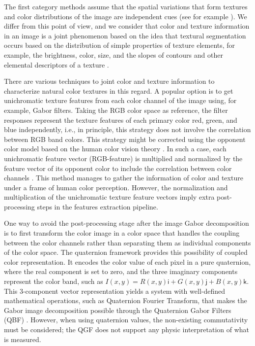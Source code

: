 The first category methods assume that the spatial variations that form textures and color distributions of the image are independent cues (see for example \citep{Permuter.Francos.ea:PR:2006}). We differ from this point of view, and we consider that color and texture information in an image is a joint phenomenon based on the idea that textural segmentation occurs based on the distribution of simple properties of texture elements, for example, the brightness, color, size, and the slopes of contours and other elemental descriptors of a texture \citep{Werner.Chalupa:Book:2004}.
 
There are various techniques to joint color and texture information to characterize natural color textures in this regard. A popular option is to get unichromatic texture features from each color channel of the image using, for example, Gabor filters. Taking the RGB color space as reference, the filter responses represent the texture features of each primary color red, green, and blue independently, i.e., in principle, this strategy does not involve the correlation between RGB band colors. This strategy might be corrected using the opponent color model based on the human color vision theory \citep{Jain.Healey:TIP:1998}. In such a case, each unichromatic feature vector (RGB-feature) is multiplied and normalized by the feature vector of its opponent color to include the correlation between color channels \citep{Palm.Keysers.ea:JCIS:2000}. This method manages to gather the information of color and texture under a frame of human color perception. However, the normalization and multiplication of the unichromatic texture feature vectors imply extra post-processing steps in the features extraction pipeline.  

One way to avoid the post-processing stage after the image Gabor decomposition is to first transform the color image in a color space that handles the coupling between the color channels rather than separating them as individual components of the color space. The quaternion framework \citep{Sangwine.Ell:VISP:2000} provides this possibility of coupled color representation. It encodes the color value of each pixel in a pure quaternion, where the real component is set to zero, and the three imaginary components represent the color band, such as $I(x, y) = R (x, y) \mathsf{i} + G (x, y) \mathsf{j} + B (x, y) \mathsf{k}$. This 3-component vector representation yields a system with well-defined mathematical operations, such as Quaternion Fourier Transform, that makes the Gabor image decomposition possible through the Quaternion Gabor Filters (QBF) \citep{Subakan.Vemuri:EMMCVPR:2009}. However, when using quaternion values, the non-existing commutativity must be considered; the QGF does not support any physic interpretation of what is measured. 

